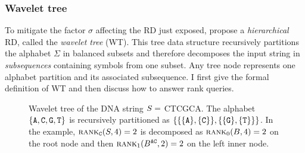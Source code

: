 
\subsubsection{Wavelet tree}

To mitigate the factor $\sigma$ affecting the RD just exposed, \cite{Grossi2003} propose a \emph{hierarchical} RD, called the \emph{wavelet tree} (WT).
This tree data structure recursively partitions the alphabet $\Sigma$ in balanced subsets and therefore decomposes the input string in \emph{subsequences} containing symbols from one subset.
Any tree node represents one alphabet partition and its associated subsequence.
I first give the formal definition of WT and then discuss how to answer rank queries.


\begin{figure}[b]
\begin{center}
\caption[Example of wavelet tree]{Wavelet tree of the DNA string $S=$ {\ttfamily CTCGCA}. The alphabet $\{\text{\ttfamily A},\text{\ttfamily C},\text{\ttfamily G},\text{\ttfamily T}\}$ is recursively partitioned as $\{\{\{\text{\ttfamily A}\},\{\text{\ttfamily C}\}\},\{\{\text{\ttfamily G}\},\{\text{\ttfamily T}\}\}\}$. In the example, $\textsc{rank}_{\text{\ttfamily C}}(S,4)=2$ is decomposed as $\textsc{rank}_0(B,4) = 2$ on the root node and then $\textsc{rank}_1(B^{\text{\ttfamily AC}}, 2) = 2$ on the left inner node.}
\label{fig:wt_dna}
\ttfamily

\end{center}
\end{figure}

